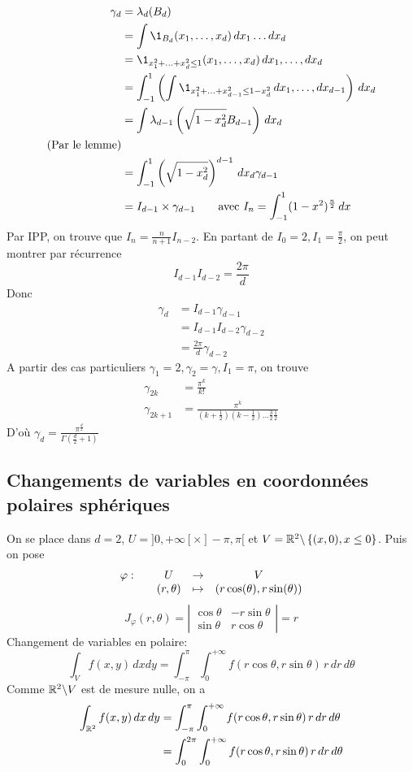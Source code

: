\documentclass[]{report}
\begin{document}
\begin{align*}
    \gamma_d & =\lambda_d(B_d)            \\
             & =\int \1_{B_d}(x_1,\ldots,x_d)\, dx_1\ldots d x_d\\
             & = \1_{x_1^2+\ldots+x_d^2\le 1}(x_1,\ldots,x_d) \, dx_1,\ldots,dx_d\\
             &=\int_{-1}^{1} \left(\int \1_{x_1^2+\ldots+x_{d-1}^2 \le 1-x_d^2} \, dx_1,\ldots,dx_{d-1}\right)\, dx_d\\
             &=\int \lambda_{d-1}\left( \sqrt{1-x_d^2} B_{d-1}\right)\, dx_d\\
             \text{(Par le lemme)}\\
             &=\int_{-1}^{1}\left(\sqrt{1-x_d^2}\right)^{d-1}\, dx_d \gamma_{d-1}\\
             &=I_{d-1}\times \gamma_{d-1}\qquad \text{avec }I_n=\int_{-1}^{1}(1-x^2)^{\frac{n}{2}}\, dx
\end{align*}
Par IPP, on trouve que $I_n=\frac{n}{n+1}I_{n-2}$. En partant de $I_0=2,I_1=\frac{\pi}{2}$, on peut montrer par récurrence
\[I_{d-1}I_{d-2}=\frac{2\pi}{d}\]
Donc
\begin{align*}
    \gamma_d&=I_{d-1}\gamma_{d-1}\\
    &= I_{d-1} I_{d-2} \gamma_{d-2}\\
    &=\frac{2\pi}{d}\gamma_{d-2}
\end{align*}
A partir des cas particuliers $\gamma_1=2,\gamma_2=\gamma,I_1=\pi$, on trouve
\begin{align*}
    \gamma_{2k}&=\frac{\pi^k}{k!}\\
    \gamma_{2k+1}&=\frac{\pi^k}{\left(k+\frac{1}{2}\right)\left(k-\frac{1}{2}\right)\ldots \frac{3}{2}\frac{1}{2}}
\end{align*}
D'où $\gamma_d=\frac{\pi^{\frac{d}{2}}}{\Gamma\left(\frac{d}{2}+1\right)}$

\subsection{Changements de variables en coordonnées polaires sphériques}

On se place dans $d=2$, $U=]0,+\infty[\times ]-\pi,\pi[$ et $V=\mathbb{R}^2\backslash\left\{(x,0),x\le 0\right\}$. Puis on pose
\[\begin{array}{ccccc} \varphi : & & U & \to & V \\ & & (r,\theta) & \mapsto & \left(r\cos(\theta),r\sin(\theta)\right) \end{array}\]
\[J_{\varphi}(r,\theta)=\left|\begin{matrix}
    \cos \theta &  -r\sin \theta\\
    \sin \theta &  r\cos \theta
\end{matrix}\right|=r\]
Changement de variables en polaire:
\[\int_V f(x,y)\, dx dy=\int_{-\pi}^{\pi}\int_{0}^{+\infty} f(r\cos \theta, r \sin \theta)\, r \, dr \, d\theta\]
Comme $\mathbb{R}^2\backslash V$ est de mesure nulle, on a
\begin{align*}
    \int_{\mathbb{R}^2}f(x,y)\, dx\, dy&=\int_{-\pi}^{\pi}\int_{0}^{+\infty} f(r\cos \theta, r \sin \theta)\, r \, dr \, d\theta\\
    &=\int_{0}^{2\pi}\int_{0}^{+\infty} f(r\cos \theta, r \sin \theta)\, r \, dr \, d\theta
\end{align*}
\end{document}
